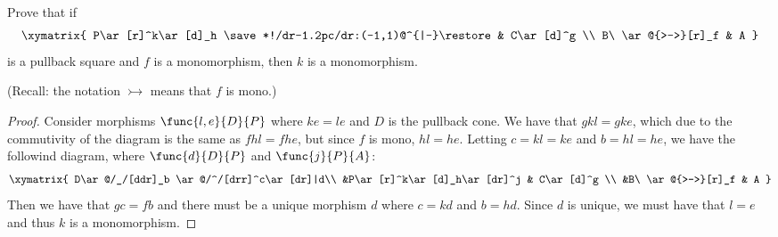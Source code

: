 \documentclass{article}
\makeatletter
\newcommand{\pullbackcorner}[1][dr]{\save*!/#1-1.2pc/#1:(-1,1)@^{|-}\restore}
\makeatother
\begin{document}
\paragraph{}
\begin{exercise}
	Prove that if
	$$
	\xymatrix{
		P\ar[r]^k\ar[d]_h \pullbackcorner & C\ar[d]^g \\
		B\ \ar@{>->}[r]_f & A
	}
	$$
	is a pullback square and $f$ is a monomorphism, then $k$ is a monomorphism.
\end{exercise}
	(Recall: the notation $\rightarrowtail$ means that $f$ is mono.)
\begin{proof}
	Consider morphisms $\func{l,e}{D}{P}$ where $ke=le$ and $D$ is the pullback cone. We have that $gkl = gke$, which due to the commutivity of the diagram is the same as $fhl = fhe$, but since $f$ is mono, $hl=he$. Letting $c=kl=ke$ and $b=hl=he$, we have the followind diagram, where $\func{d}{D}{P}$ and $\func{j}{P}{A}$:
	$$
	\xymatrix{
		D\ar@/_/[ddr]_b \ar@/^/[drr]^c\ar[dr]|d\\
		&P\ar[r]^k\ar[d]_h\ar[dr]^j & C\ar[d]^g \\
		&B\ \ar@{>->}[r]_f & A
	}
	$$
	Then we have that $gc=fb$ and there must be a unique morphism $d$ where $c=kd$ and $b=hd$. Since $d$ is unique, we must have that $l=e$ and thus $k$ is a monomorphism.
\end{proof}
\end{document}
